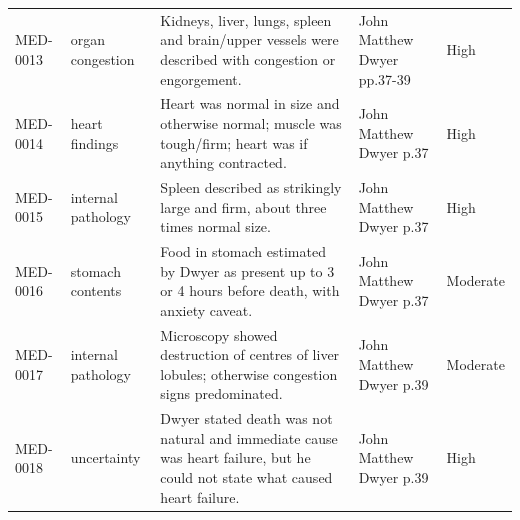 \begin{longtable}{p{}p{}p{}p{}p{}}
MED-0013 & organ congestion & Kidneys, liver, lungs, spleen and brain/upper vessels were described with congestion or engorgement. & John Matthew Dwyer pp.37-39 & High \\
MED-0014 & heart findings & Heart was normal in size and otherwise normal; muscle was tough/firm; heart was if anything contracted. & John Matthew Dwyer p.37 & High \\
MED-0015 & internal pathology & Spleen described as strikingly large and firm, about three times normal size. & John Matthew Dwyer p.37 & High \\
MED-0016 & stomach contents & Food in stomach estimated by Dwyer as present up to 3 or 4 hours before death, with anxiety caveat. & John Matthew Dwyer p.37 & Moderate \\
MED-0017 & internal pathology & Microscopy showed destruction of centres of liver lobules; otherwise congestion signs predominated. & John Matthew Dwyer p.39 & Moderate \\
MED-0018 & uncertainty & Dwyer stated death was not natural and immediate cause was heart failure, but he could not state what caused heart failure. & John Matthew Dwyer p.39 & High \\
\bottomrule
\end{longtable}

